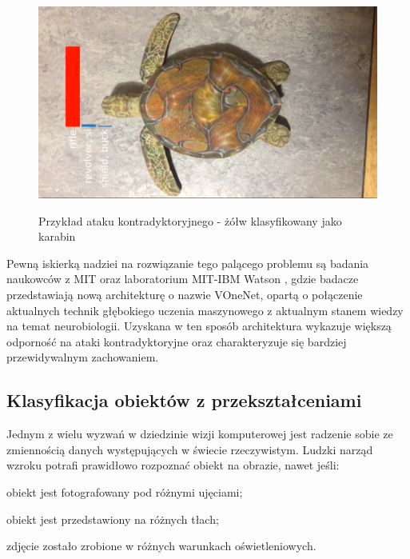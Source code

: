 \begin{figure}[h]
\begin{center}
\includegraphics[width=15cm]{resources/figures/ai-adversarial-attack-turtle.png}
\caption{Przykład ataku kontradyktoryjnego - żółw klasyfikowany jako karabin}
\label{TurtleAdversarialAttack}
\end{center}
\end{figure}

\vspace{-0.5cm}
Pewną iskierką nadziei na rozwiązanie tego palącego problemu są badania naukowców z MIT oraz laboratorium MIT-IBM Watson \cite{cnns:neuroscienceProtection}, gdzie badacze przedstawiają nową architekturę o nazwie VOneNet, opartą o połączenie aktualnych technik głębokiego uczenia maszynowego z aktualnym stanem wiedzy na temat neurobiologii. Uzyskana w ten sposób architektura wykazuje większą odporność na ataki kontradyktoryjne oraz charakteryzuje się bardziej przewidywalnym zachowaniem.

\subsection{Klasyfikacja obiektów z przekształceniami}
Jednym z wielu wyzwań w dziedzinie wizji komputerowej jest radzenie sobie ze zmiennością danych występujących w świecie rzeczywistym. Ludzki narząd wzroku potrafi prawidłowo rozpoznać obiekt na obrazie, nawet jeśli:
\vspace{-0.5cm}
\begin{itemize*}
\item obiekt jest fotografowany pod różnymi ujęciami;
\item obiekt jest przedstawiony na różnych tłach;
\item zdjęcie zostało zrobione w różnych warunkach oświetleniowych.
\end{itemize*}

